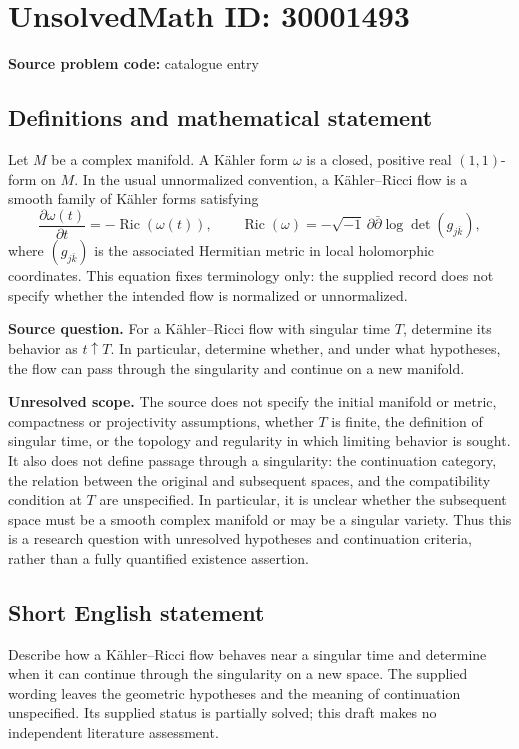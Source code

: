 \documentclass[11pt]{article}
\begin{document}
\section*{UnsolvedMath ID: 30001493}
\textbf{Source problem code:} catalogue entry
\subsection{Definitions and mathematical statement}
Let \(M\) be a complex manifold. A Kähler form \(\omega\) is a closed, positive real \((1,1)\)-form on \(M\). In the usual unnormalized convention, a Kähler--Ricci flow is a smooth family of Kähler forms satisfying
\[
\frac{\partial\omega(t)}{\partial t}=-\operatorname{Ric}(\omega(t)),
\qquad
\operatorname{Ric}(\omega)=-\sqrt{-1}\,\partial\bar\partial\log\det(g_{j\bar k}),
\]
where \((g_{j\bar k})\) is the associated Hermitian metric in local holomorphic coordinates. This equation fixes terminology only: the supplied record does not specify whether the intended flow is normalized or unnormalized.

\textbf{Source question.} For a Kähler--Ricci flow with singular time \(T\), determine its behavior as \(t\uparrow T\). In particular, determine whether, and under what hypotheses, the flow can pass through the singularity and continue on a new manifold.

\textbf{Unresolved scope.} The source does not specify the initial manifold or metric, compactness or projectivity assumptions, whether \(T\) is finite, the definition of singular time, or the topology and regularity in which limiting behavior is sought. It also does not define passage through a singularity: the continuation category, the relation between the original and subsequent spaces, and the compatibility condition at \(T\) are unspecified. In particular, it is unclear whether the subsequent space must be a smooth complex manifold or may be a singular variety. Thus this is a research question with unresolved hypotheses and continuation criteria, rather than a fully quantified existence assertion.
\subsection{Short English statement}
Describe how a Kähler--Ricci flow behaves near a singular time and determine when it can continue through the singularity on a new space. The supplied wording leaves the geometric hypotheses and the meaning of continuation unspecified. Its supplied status is partially solved; this draft makes no independent literature assessment.
\end{document}
